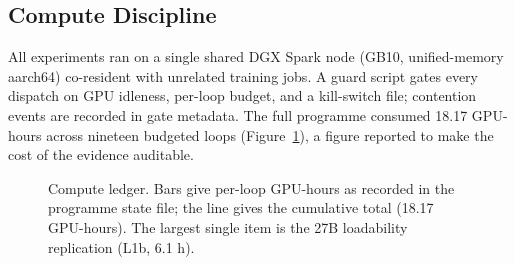 \subsection{Compute Discipline}

All experiments ran on a single shared DGX Spark node (GB10, unified-memory aarch64) co-resident with unrelated training jobs. A guard script gates every dispatch on GPU idleness, per-loop budget, and a kill-switch file; contention events are recorded in gate metadata. The full programme consumed 18.17 GPU-hours across nineteen budgeted loops (Figure~\ref{fig:compute}), a figure reported to make the cost of the evidence auditable.

\begin{figure}[t]
\centering
\resizebox{\columnwidth}{!}{}
\caption{Compute ledger. Bars give per-loop GPU-hours as recorded in the programme state file; the line gives the cumulative total (18.17 GPU-hours). The largest single item is the 27B loadability replication (L1b, 6.1 h).}
\label{fig:compute}
\end{figure}
